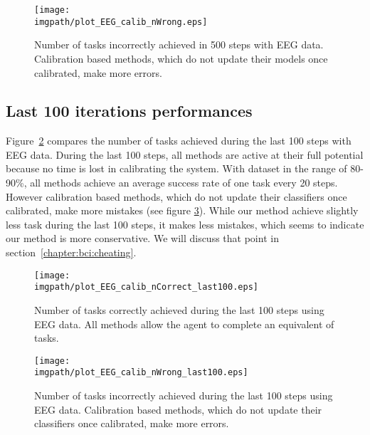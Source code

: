 \begin{figure}[!htbp]
\centering
\texttt{[image: \\imgpath/plot\_EEG\_calib\_nWrong.eps]}
\caption{Number of tasks incorrectly achieved in 500 steps with EEG data. Calibration based methods, which do not update their models once calibrated, make more errors.}
\label{fig:nWrongEEG}
\end{figure}

\subsection{Last 100 iterations performances}

Figure~\ref{fig:nCorrectEEG_last100} compares the number of tasks achieved during the last 100 steps with EEG data. During the last 100 steps, all methods are active at their full potential because no time is lost in calibrating the system. With dataset in the range of 80-90\%, all methods achieve an average success rate of one task every 20 steps. However calibration based methods, which do not update their classifiers once calibrated, make more mistakes (see figure \ref{fig:nWrongEEG_last100}). While our method achieve slightly less task during the last 100 steps, it makes less mistakes, which seems to indicate our method is more conservative. We will discuss that point in section~\ref{chapter:bci:cheating}.

\begin{figure}[!htbp]
\centering
\texttt{[image: \\imgpath/plot\_EEG\_calib\_nCorrect\_last100.eps]}
\caption{Number of tasks correctly achieved during the last 100 steps using EEG data. All methods allow the agent to complete an equivalent of tasks.}
\label{fig:nCorrectEEG_last100}
\end{figure} 

\begin{figure}[!htbp]
\centering
\texttt{[image: \\imgpath/plot\_EEG\_calib\_nWrong\_last100.eps]}
\caption{Number of tasks incorrectly achieved during the last 100 steps using EEG data. Calibration based methods, which do not update their classifiers once calibrated, make more errors.}
\label{fig:nWrongEEG_last100}
\end{figure} 

